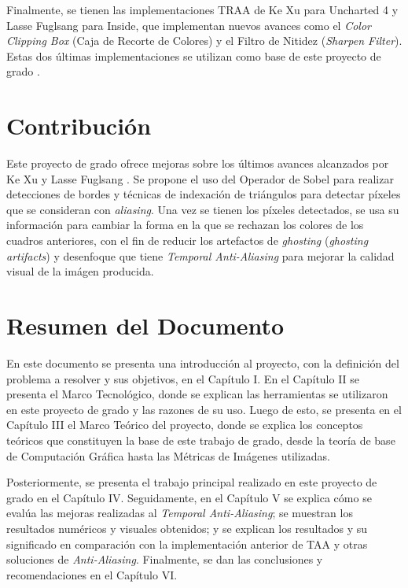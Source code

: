 \documentclass[pregrado]{tesis-usb} %
\begin{document}
Finalmente, se tienen las implementaciones TRAA de Ke Xu para Uncharted 4 y Lasse Fuglsang para Inside, que implementan nuevos avances como el \textit{Color Clipping Box} (Caja de Recorte de Colores) y el Filtro de Nitidez (\textit{Sharpen Filter}). Estas dos últimas implementaciones se utilizan como base de este proyecto de grado \cite{Fuglsand2016, XU2016}.


\section{Contribución}
Este proyecto de grado ofrece mejoras sobre los últimos avances alcanzados por Ke Xu y Lasse Fuglsang \cite{Fuglsand2016, XU2016}. Se propone el uso del Operador de Sobel para realizar detecciones de bordes y técnicas de indexación de triángulos para detectar píxeles que se consideran con \textit{aliasing}. Una vez se tienen los píxeles detectados, se usa su información para cambiar la forma en la que se rechazan los colores de los cuadros anteriores, con el fin de reducir los artefactos de \textit{ghosting} (\textit{ghosting artifacts})  y desenfoque que tiene \textit{Temporal Anti-Aliasing} para mejorar la calidad visual de la imágen producida.

\section{Resumen del Documento}
En este documento se presenta una introducción al proyecto, con la definición del problema a resolver y sus objetivos, en el Capítulo I. En el Capítulo II se presenta el Marco Tecnológico, donde se explican las herramientas se utilizaron en este proyecto de grado y las razones de su uso. Luego de esto, se presenta en el Capítulo III el Marco Teórico del proyecto, donde se explica los conceptos teóricos que constituyen la base de este trabajo de grado, desde la teoría de base de Computación Gráfica hasta las Métricas de Imágenes utilizadas. 

Posteriormente, se presenta el trabajo principal realizado en este proyecto de grado en el Capítulo IV. Seguidamente, en el Capítulo V se explica cómo se evalúa las mejoras realizadas al \textit{Temporal Anti-Aliasing}; se muestran los resultados numéricos y visuales obtenidos; y se explican los resultados y su significado en comparación con la implementación anterior de TAA y otras soluciones de \textit{Anti-Aliasing}. Finalmente, se dan las conclusiones y recomendaciones en el Capítulo VI.
\end{document}
